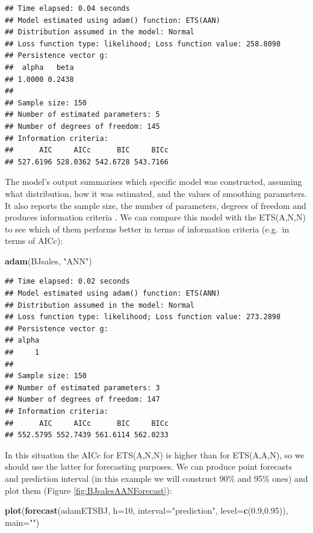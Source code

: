 \documentclass[]{book}
\newenvironment{Shaded}{\begin{snugshade}}{\end{snugshade}}
\newcommand{\DataTypeTok}[1]{\textcolor[rgb]{0.13,0.29,0.53}{#1}}
\newcommand{\DecValTok}[1]{\textcolor[rgb]{0.00,0.00,0.81}{#1}}
\newcommand{\FloatTok}[1]{\textcolor[rgb]{0.00,0.00,0.81}{#1}}
\newcommand{\KeywordTok}[1]{\textcolor[rgb]{0.13,0.29,0.53}{\textbf{#1}}}
\newcommand{\NormalTok}[1]{#1}
\newcommand{\StringTok}[1]{\textcolor[rgb]{0.31,0.60,0.02}{#1}}
\theoremstyle{definition}
\theoremstyle{definition}
\theoremstyle{definition}
\theoremstyle{definition}
\theoremstyle{remark}
\begin{document}
\begin{verbatim}
## Time elapsed: 0.04 seconds
## Model estimated using adam() function: ETS(AAN)
## Distribution assumed in the model: Normal
## Loss function type: likelihood; Loss function value: 258.8098
## Persistence vector g:
##  alpha   beta 
## 1.0000 0.2438 
## 
## Sample size: 150
## Number of estimated parameters: 5
## Number of degrees of freedom: 145
## Information criteria:
##      AIC     AICc      BIC     BICc 
## 527.6196 528.0362 542.6728 543.7166
\end{verbatim}

The model's output summarises which specific model was constructed, assuming what distribution, how it was estimated, and the values of smoothing parameters. It also reports the sample size, the number of parameters, degrees of freedom and produces information criteria \citep[see Section 13.4 of][]{SvetunkovSBA}. We can compare this model with the ETS(A,N,N) to see which of them performs better in terms of information criteria (e.g.~in terms of AICc):

\begin{Shaded}
\begin{Highlighting}[]
\KeywordTok{adam}\NormalTok{(BJsales, }\StringTok{"ANN"}\NormalTok{)}
\end{Highlighting}
\end{Shaded}

\begin{verbatim}
## Time elapsed: 0.02 seconds
## Model estimated using adam() function: ETS(ANN)
## Distribution assumed in the model: Normal
## Loss function type: likelihood; Loss function value: 273.2898
## Persistence vector g:
## alpha 
##     1 
## 
## Sample size: 150
## Number of estimated parameters: 3
## Number of degrees of freedom: 147
## Information criteria:
##      AIC     AICc      BIC     BICc 
## 552.5795 552.7439 561.6114 562.0233
\end{verbatim}

In this situation the AICc for ETS(A,N,N) is higher than for ETS(A,A,N), so we should use the latter for forecasting purposes. We can produce point forecasts and prediction interval (in this example we will construct 90\% and 95\% ones) and plot them (Figure \ref{fig:BJsalesAANForecast}):

\begin{Shaded}
\begin{Highlighting}[]
\KeywordTok{plot}\NormalTok{(}\KeywordTok{forecast}\NormalTok{(adamETSBJ, }\DataTypeTok{h=}\DecValTok{10}\NormalTok{,}
              \DataTypeTok{interval=}\StringTok{"prediction"}\NormalTok{, }\DataTypeTok{level=}\KeywordTok{c}\NormalTok{(}\FloatTok{0.9}\NormalTok{,}\FloatTok{0.95}\NormalTok{)),}
     \DataTypeTok{main=}\StringTok{""}\NormalTok{)}
\end{Highlighting}
\end{Shaded}
\end{document}
